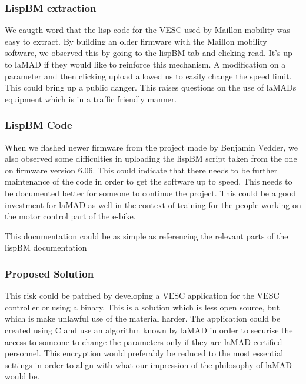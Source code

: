 \documentclass[conference]{IEEEtran}
\begin{document}
\subsubsection{LispBM extraction}
We caugth word that the lisp code for the VESC used by Maillon mobility was easy to extract. By building an older 
firmware with the Maillon mobility software, we observed this by going to the lispBM tab and clicking read. It's up to 
laMAD if they would like to reinforce this mechanism. A modification on a parameter and then clicking upload allowed 
us to easily change the speed limit. This could bring up a public danger. This raises questions on the use of laMADs 
equipment which is in a traffic friendly manner.

\subsubsection{LispBM Code}
When we flashed newer firmware from the project made by Benjamin Vedder\cite{b1}, we also observed some difficulties in 
uploading the lispBM script taken from the one on firmware version 6.06. This could indicate that there needs to be 
further maintenance of the code in order to get the software up to speed. This needs to be documented better for someone
 to continue the project. This could be a good investment for laMAD as well in the context of training for the people 
 working on the motor control part of the e-bike.

This documentation could be as simple as referencing the relevant parts of the lispBM documentation \cite{b2}

\subsubsection{Proposed Solution}
This risk could be patched by developing a VESC application for the VESC controller or using a binary. This is a 
solution which is less open source, but which is make unlawful use of the material harder. The application could be 
created using C and use an algorithm known by laMAD in order to securise the access to someone to change the parameters 
only if they are laMAD certified personnel. This encryption would preferably be reduced to the most essential settings 
in order to align with what our impression of the philosophy of laMAD would be.
\end{document}
